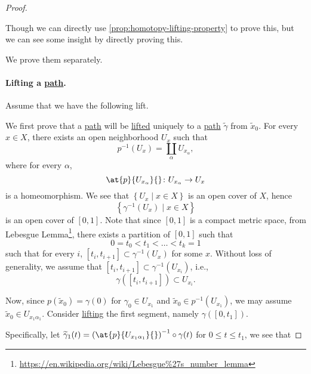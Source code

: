 \begin{proof}
	\begin{note}
		Though we can directly use \autoref{prop:homotopy-lifting-property} to prove this, but we can see some insight by directly proving this.
	\end{note}

	We prove them separately.
	\paragraph{Lifting a \hyperref[def:path]{path}.} Assume that we have the following lift.
	\begin{figure}[H]
		\centering
		\label{fig:pf:col:lec14}
	\end{figure}
	We first prove that a \hyperref[def:path]{path} will be \hyperref[prop:homotopy-lifting-property]{lifted} uniquely to a \hyperref[def:path]{path} \(\widetilde{\gamma} \)
	from \(\widetilde{x} _0\). For every \(x\in X\), there exists an open neighborhood \(U_x\) such that
	\[
		p^{-1} (U_{x} ) = \coprod\limits_{\alpha }U_{x_\alpha },
	\]
	where for every \(\alpha \),
	\[
		\at{p}{U_{x_\alpha }}{} \colon U_{x_{\alpha }}\to U_{x}
	\]
	is a homeomorphism. We see that \(\left\{U_{x} \mid x\in X\right\}\) is an open cover of \(X\), hence
	\[
		\left\{\gamma ^{-1} (U_{x} )\mid x\in X\right\}
	\]
	is an open cover of \([0, 1]\). Note that since \([0, 1]\) is a compact metric space, from Lebesgue Lemma\footnote{\url{https://en.wikipedia.org/wiki/Lebesgue\%27s_number_lemma}},
	there exists a partition of \([0, 1]\) such that
	\[
		0 = t_0 < t_1 < \ldots  < t_{k} = 1
	\]
	such that for every \(i\), \([t_{i} , t_{i+1}]\subset \gamma ^{-1} (U_{x} ) \) for some \(x\). Without loss of generality, we assume that \([t_{i} , t_{i+1}]\subset \gamma ^{-1} (U_{x_{i}})\),
	i.e.,
	\[
		\gamma ([t_{i} , t_{i+1}])\subset U_{x_{i} }.
	\]
	\begin{figure}[H]
		\centering
		\label{fig:pf:col:lec14-2}
	\end{figure}
	Now, since \(p(\widetilde{x} _0) = \gamma (0)\) for \(\gamma _0\in U_{x_1}\) and \(\widetilde{x} _0\in p^{-1} (U_{x_1})\), we may assume \(\widetilde{x} _0\in U_{x_1 \alpha _1}\).
	Consider \hyperref[prop:homotopy-lifting-property]{lifting} the first segment, namely \(\gamma ([0, t_1])\).
	\begin{figure}[H]
		\centering
		\label{fig:pf:col:lec14-3}
	\end{figure}
	Specifically, let \(\widetilde{\gamma}_1 (t) = \left(\at{p}{U_{x_1 \alpha _1}}{}\right)^{-1} \circ \gamma (t) \) for \(0\leq t\leq t_1\), we see that

\end{proof}
